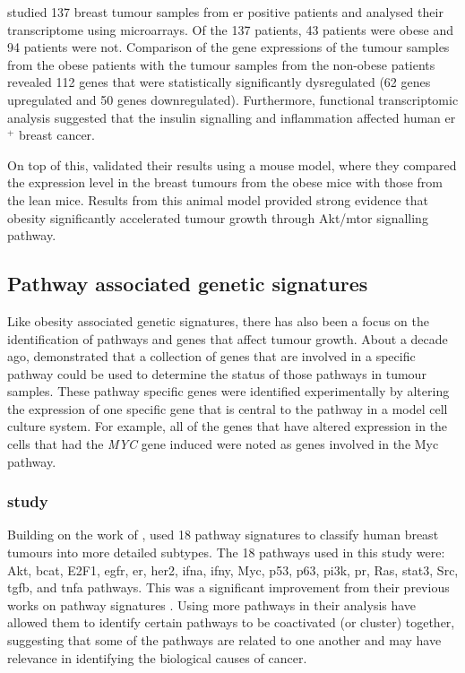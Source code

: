 \citet{Fuentes-Mattei2014} studied 137 breast tumour samples from \gls{er} positive patients and analysed their transcriptome using microarrays.
Of the 137 patients, 43 patients were obese and 94 patients were not.
Comparison of the gene expressions of the tumour samples from the obese patients with the tumour samples from the non-obese patients revealed 112 genes that were statistically significantly dysregulated (62 genes upregulated and 50 genes downregulated).
Furthermore, functional transcriptomic analysis suggested that the insulin signalling and inflammation affected human \gls{er}$^+$ breast cancer.

On top of this, \citet{Fuentes-Mattei2014} validated their results using a mouse model, where they compared the expression level in the breast tumours from the obese mice with those from the lean mice.
Results from this animal model provided strong evidence that obesity significantly accelerated tumour growth through Akt/\gls{mtor} signalling pathway.

\subsection{Pathway associated genetic signatures}
\label{sub:pathway_associated_genetic_signatures}

Like obesity associated genetic signatures, there has also been a focus on the identification of pathways and genes that affect tumour growth.
About a decade ago, \citet{Bild2006} demonstrated that a collection of genes that are involved in a specific pathway could be used to determine the status of those pathways in tumour samples.
These pathway specific genes were identified experimentally by altering the expression of one specific gene that is central to the pathway in a model cell culture system.
For example, all of the genes that have altered expression in the cells that had  the \textit{MYC} gene induced were noted as genes involved in the Myc pathway.

\vspace{-2mm}

\subsubsection{\citet{Gatza2010a} study}
\label{ssub:gatza_study}

Building on the work of \citet{Bild2006}, \citet{Gatza2010a} used 18 pathway signatures to classify human breast tumours into more detailed subtypes.
The 18 pathways used in this study were: Akt, \gls{bcat}, E2F1, \gls{egfr}, \gls{er}, \gls{her2}, \gls{ifna}, \gls{ifny}, Myc, p53, p63, \gls{pi3k}, \gls{pr}, Ras, \gls{stat3}, Src, \gls{tgfb}, and \gls{tnfa} pathways.
This was a significant improvement from their previous works on pathway signatures \citep{Bild2006,Bild2009}.
Using more pathways in their analysis have allowed them to identify certain pathways to be coactivated (or cluster) together, suggesting that some of the pathways are related to one another and may have relevance in identifying the biological causes of cancer.

